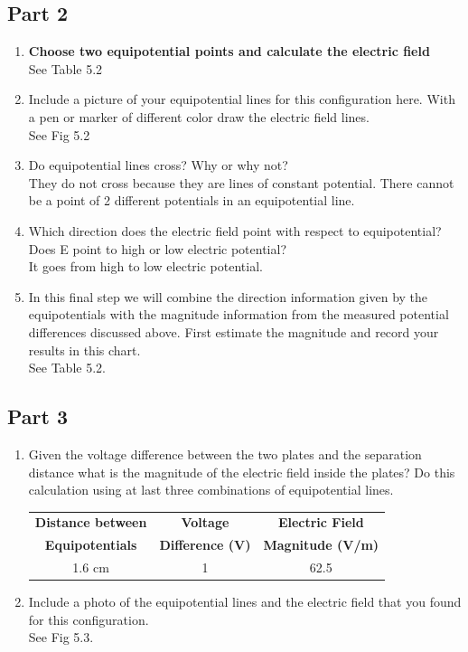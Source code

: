 \documentclass[titlepage]{article}
\begin{document}
	\subsection{Part 2}
		\begin{enumerate}
			\item \textbf{Choose two equipotential points and calculate the electric field}\\
				See Table 5.2
			\item Include a picture of your equipotential lines for this configuration here. With a pen or marker of different color draw the electric field lines.\\
				See Fig 5.2
			\item Do equipotential lines cross? Why or why not?\\
				They do not cross because they are lines of constant potential. There cannot be a point of 2 different potentials in an equipotential line.
			\item Which direction does the electric field point with respect to equipotential? Does E point to high or low electric potential?\\
				It goes from high to low electric potential.
			\item In this final step we will combine the direction information given by the equipotentials with the magnitude information from the measured potential differences discussed above. First estimate the magnitude and record your results in this chart.\\
				See Table 5.2.
		\end{enumerate}
		\subsection{Part 3}
		\begin{enumerate}
			\item Given the voltage difference between the two plates and the separation distance what is the magnitude of the electric field inside the plates? Do this calculation using at last three combinations of equipotential lines.\\
		\begin{center}
				\begin{table}[h]
			\begin{tabular}{c|c|c}
				\textbf{Distance between} & \textbf{Voltage} & \textbf{Electric Field} \\
				\textbf{Equipotentials} & \textbf{Difference (V)} & \textbf{Magnitude (V/m)}\\
				\hline
				1.6 cm & 1 & 62.5\\
			\end{tabular}
		\end{table}
	\end{center}

			\item Include a photo of the equipotential lines and the electric field that you found for this configuration.\\
				See Fig 5.3.
		\end{enumerate}
\end{document}
